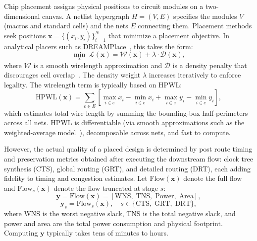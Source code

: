 \documentclass[sigconf,anonymous,review,9pt]{acmart}
\begin{document}
Chip placement assigns physical positions to circuit modules on a
two-dimensional canvas. A netlist hypergraph $H = (V, E)$ specifies the
modules $V$ (macros and standard cells) and the nets $E$ connecting
them. Placement methods seek positions
$\mathbf{x} = \{(x_i, y_i)\}_{i=1}^{N}$ that minimize a placement
objective. In analytical placers such as
DREAMPlace~\cite{lin2019dreamplace}, this takes the form:
\begin{equation}
\label{eq:placement}
\min_{\mathbf{x}} \; \mathcal{L}(\mathbf{x})
= \mathcal{W}(\mathbf{x}) + \lambda \cdot \mathcal{D}(\mathbf{x}),
\end{equation}
where $\mathcal{W}$ is a smooth wirelength approximation and
$\mathcal{D}$ is a density penalty that discourages cell
overlap~\cite{lu2015eplace}. The density weight $\lambda$ increases
iteratively to enforce legality. The wirelength term is typically based
on HPWL:
\begin{equation}
\label{eq:hpwl}
\mathrm{HPWL}(\mathbf{x}) = \sum_{e \in E}
\left[\max_{i \in e} x_i - \min_{i \in e} x_i
+ \max_{i \in e} y_i - \min_{i \in e} y_i\right],
\end{equation}
which estimates total wire length by summing the bounding-box
half-perimeters across all nets. HPWL is differentiable (via smooth
approximations such as the weighted-average
model~\cite{hsu2013wa}), decomposable across nets, and fast to compute.

However, the actual quality of a placed design is determined by
post route timing and preservation metrics obtained after executing the downstream flow:
clock tree synthesis (CTS), global routing (GRT), and detailed routing
(DRT), each adding fidelity to timing and congestion estimates. Let
$\mathrm{Flow}(\mathbf{x})$ denote the full flow and
$\mathrm{Flow}_s(\mathbf{x})$ denote the flow truncated at stage $s$:
\begin{equation}
\label{eq:ppa}
\mathbf{y} = \mathrm{Flow}(\mathbf{x})
= \left[\mathrm{WNS},\; \mathrm{TNS},\;
\mathrm{Power},\; \mathrm{Area}\right],
\end{equation}
\begin{equation}
\label{eq:partial_flow}
\mathbf{y}_s = \mathrm{Flow}_s(\mathbf{x}), \quad
s \in \{\text{CTS},\; \text{GRT},\; \text{DRT}\},
\end{equation}
where WNS is the worst negative slack, TNS is the total negative slack,
and power and area are the total power consumption and physical footprint.
Computing $\mathbf{y}$ typically takes tens of minutes to hours.
\end{document}
